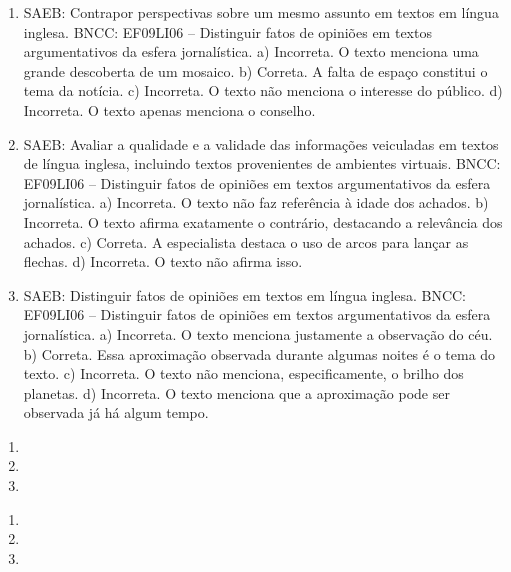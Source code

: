 \begin{enumerate}
\item
SAEB: Contrapor perspectivas sobre um mesmo assunto em textos em língua
inglesa.
BNCC: EF09LI06 -- Distinguir fatos de opiniões em textos argumentativos
da esfera jornalística.
a) Incorreta. O texto menciona uma grande descoberta de um mosaico.
b) Correta. A falta de espaço constitui o tema da notícia.
c) Incorreta. O texto não menciona o interesse do público.
d) Incorreta. O texto apenas menciona o conselho.

\item
SAEB: Avaliar a qualidade e a validade das informações veiculadas em
textos de língua inglesa, incluindo textos provenientes de ambientes
virtuais.
BNCC: EF09LI06 -- Distinguir fatos de opiniões em textos argumentativos
da esfera jornalística.
a) Incorreta. O texto não faz referência à idade dos achados.
b) Incorreta. O texto afirma exatamente o contrário, destacando a
relevância dos achados.
c) Correta. A especialista destaca o uso de arcos para lançar as
flechas.
d) Incorreta. O texto não afirma isso.

\item
SAEB: Distinguir fatos de opiniões em textos em língua inglesa.
BNCC: EF09LI06 -- Distinguir fatos de opiniões em textos argumentativos
da esfera jornalística.
a) Incorreta. O texto menciona justamente a observação do céu.
b) Correta. Essa aproximação observada durante algumas noites é o tema
do texto.
c) Incorreta. O texto não menciona, especificamente, o brilho dos planetas.
d) Incorreta. O texto menciona que a aproximação pode ser observada
já há algum tempo.
\end{enumerate}


\begin{enumerate}
\item

\item

\item
\end{enumerate}


\begin{enumerate}
\item

\item

\item
\end{enumerate}


